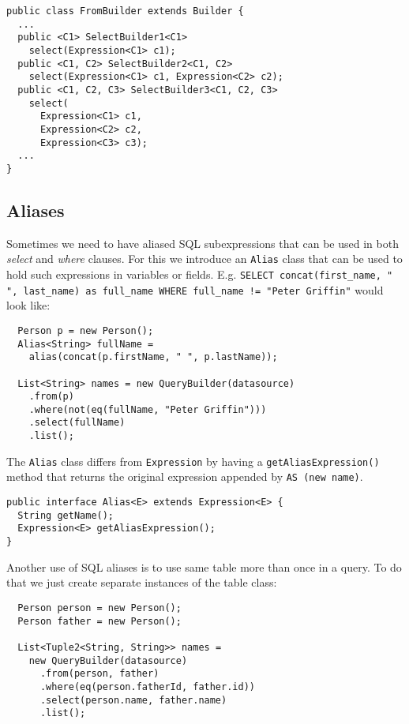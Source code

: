 \documentclass{sig-alternate}
\begin{document}
\begin{verbatim}
public class FromBuilder extends Builder {
  ...
  public <C1> SelectBuilder1<C1> 
    select(Expression<C1> c1);
  public <C1, C2> SelectBuilder2<C1, C2> 
    select(Expression<C1> c1, Expression<C2> c2);
  public <C1, C2, C3> SelectBuilder3<C1, C2, C3> 
    select(
      Expression<C1> c1, 
      Expression<C2> c2, 
      Expression<C3> c3);
  ...
}
\end{verbatim}

\subsection{Aliases}

Sometimes we need to have aliased SQL subexpressions that can be used in both \emph{select} and \emph{where} clauses. For this we introduce an \verb!Alias! class that can be used to hold such expressions in variables or fields. E.g. \texttt{SELECT concat(first\_name, " ", last\_name) as full\_name WHERE full\_name != "Peter Griffin"} would look like:

\begin{verbatim}
  Person p = new Person();
  Alias<String> fullName =
    alias(concat(p.firstName, " ", p.lastName));
		
  List<String> names = new QueryBuilder(datasource)
    .from(p)
    .where(not(eq(fullName, "Peter Griffin")))
    .select(fullName)
    .list();
\end{verbatim}

The \verb!Alias! class differs from \verb!Expression! by having a \verb!getAliasExpression()! method that returns the original expression appended by \verb!AS (new name)!. 

\begin{verbatim}
public interface Alias<E> extends Expression<E> {
  String getName();
  Expression<E> getAliasExpression();
}
\end{verbatim}
 
Another use of SQL aliases is to use same table more than once in a query. To do that we just create separate instances of the table class:

\begin{verbatim}
  Person person = new Person();
  Person father = new Person();
		
  List<Tuple2<String, String>> names =
    new QueryBuilder(datasource)
      .from(person, father)
      .where(eq(person.fatherId, father.id))
      .select(person.name, father.name)
      .list();
\end{verbatim}
\end{document}
